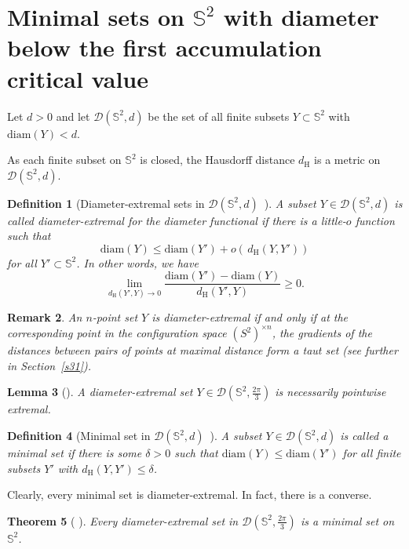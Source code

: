 \documentclass[12pt]{amsart}
\theoremstyle{plain}
\newtheorem{theorem}{Theorem}[section]
\newtheorem{lemma}[theorem]{Lemma}
\newtheorem{remark}[theorem]{Remark}
\newtheorem{definition}[theorem]{Definition}
\newcommand{\Sp}{\mathbb{S}}
\newcommand{\diam}{\mathrm{diam}}
\newcommand{\dH}{d_\mathrm{H}}
\numberwithin{equation}{section}
\begin{document}
\section
{Minimal sets on $\Sp^2$ with diameter below the first accumulation
  critical value}

Let $d>0$ and let $\mathcal D(\Sp^2, d)$ be the set of all finite
subsets $Y\subset \Sp^2$ with $\diam(Y)<d$.

As each finite subset on $\Sp^2$ is closed, the Hausdorff distance $\dH$ is a metric on $\mathcal D(\Sp^2, d)$.

\begin{definition}
[Diameter-extremal sets in $\mathcal D(\Sp^2,
  d)$~\cite{katz1989diameter}] A subset $Y\in \mathcal D(\Sp^2, d)$ is
called \emph{diameter-extremal} for the diameter functional if there
is a little-$o$ function such that
	\[
	\diam(Y) \leq \diam(Y') + o(\,\dH(Y, Y'))
	\]
	for all $Y'\subset \Sp^2$.
    In other words, we have
	\[
		\lim_{\dH(Y', Y) \rightarrow 0}\frac{\diam(Y')-\diam(Y)}{\dH(Y', Y)}\geq 0.
	\]

\end{definition}

\begin{remark}
An $n$-point set $Y$ is diameter-extremal if and only if at the
corresponding point in the configuration space $(S^2)^{\times n}$, the
gradients of the distances between pairs of points at maximal distance
form a taut set (see further in Section~\ref{s31}).
\end{remark}

\begin{lemma}
[{\cite[Corollary~3.4]{katz1989diameter}}]
\label{lem:critical_is_pointwise_extremal}
A diameter-extremal set $Y\in \mathcal D(\Sp^2, \frac{2\pi}{3})$ is
necessarily pointwise extremal.
\end{lemma}


\begin{definition}
[Minimal set in $\mathcal D(\Sp^2, d)$~\cite{katz1989diameter}] A
subset $Y\in \mathcal D(\Sp^2, d)$ is called a \emph{minimal set} if
there is some $\delta>0$ such that $\diam(Y)\leq \diam(Y')$ for all
finite subsets $Y'$ with $\dH(Y, Y')\leq \delta$.
\end{definition}

Clearly, every minimal set is diameter-extremal.  In fact, there is a converse.

\begin{theorem}[
{\cite[Theorem 2]{katz1989diameter}}]\label{thm:critical_is_minimal}
  Every diameter-extremal set in $\mathcal D(\Sp^2, \frac{2\pi}{3})$
  is a minimal set on $\Sp^2$.
\end{theorem}
\end{document}
